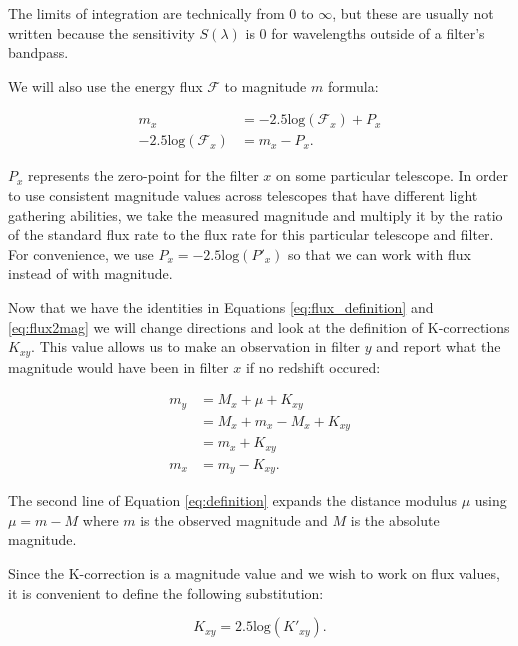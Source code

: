 \documentclass{article}
\begin{document}
The limits of integration are technically from 0 to $\infty$, but these are
usually not written because the sensitivity $S(\lambda)$ is 0 for wavelengths
outside of a filter's bandpass.

We will also use the energy flux $\mathcal{F}$ to magnitude $m$ formula:

\begin{equation}
\begin{aligned}
\label{eq:flux2mag}
                             m_x &= -2.5 \text{log}(\mathcal{F}_x) + P_x \\
  -2.5 \text{log}(\mathcal{F}_x) &= m_x - P_x .
\end{aligned}
\end{equation}

$P_x$ represents the zero-point for the filter $x$ on some particular
telescope. In order to use consistent magnitude values across telescopes that
have different light gathering abilities, we take the measured magnitude and
multiply it by the ratio of the standard flux rate to the flux rate for this
particular telescope and filter. For convenience, we use $P_x = -2.5
\text{log}(P'_x)$ so that we can work with flux instead of with magnitude.

Now that we have the identities in Equations \ref{eq:flux_definition} and
\ref{eq:flux2mag} we will change directions and look at the definition of
K-corrections $K_{xy}$. This value allows us to make an observation in filter
$y$ and report what the magnitude would have been in filter $x$ if no redshift
occured:

\begin{equation}
\begin{aligned}
\label{eq:definition}
  m_y &= M_x + \mu + K_{xy} \\
      &= M_x + m_x - M_x + K_{xy} \\
      &= m_x + K_{xy} \\
  m_x &= m_y - K_{xy} .
\end{aligned}
\end{equation}

The second line of Equation \ref{eq:definition} expands the distance modulus
$\mu$ using $\mu = m - M$ where $m$ is the observed magnitude and $M$ is the
absolute magnitude.

Since the K-correction is a magnitude value and we wish to work on flux values,
it is convenient to define the following substitution:

\begin{equation}
\label{eq:k_substitution}
  K_{xy} = 2.5\text{log}(K'_{xy}) .
\end{equation}
\end{document}
